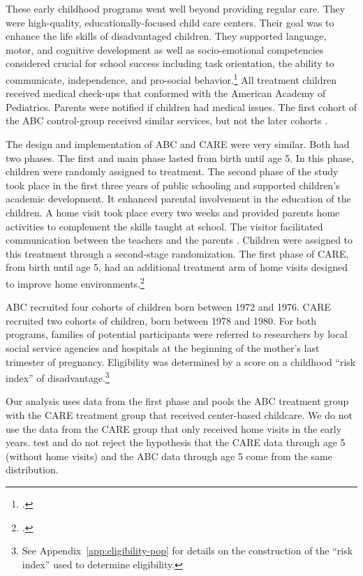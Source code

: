 These early childhood programs went well beyond providing regular care. They were high-quality, educationally-focused child care centers. Their goal was to enhance the life skills of disadvantaged children. They supported language, motor, and cognitive development as well as socio-emotional competencies considered crucial for school success including task orientation, the ability to communicate, independence, and pro-social behavior.\footnote{\citet{Sparling_1974_Synth_Edu_Infant_SPEECH, Ramey_Collier_etal_1976_CarolinaAbecedarianProject, Ramey_etal_1985_Project-CARE_TiECSE, Wasik_Ramey_etal_1990_CD, Ramey-etal_2012-ABC}.} All treatment children received medical check-ups that conformed with the American Academy of Pediatrics. Parents were notified if children had medical issues. The first cohort of the ABC control-group received similar services, but not the later cohorts \citep{Campbell_Conti_etal_2014_EarlyChildhoodInvestments,Henderson-et-al_1982_NEJoM}.

The design and implementation of ABC and CARE were very similar. Both had two phases. The first and main phase lasted from birth until age 5. In this phase, children were randomly assigned to treatment. The second phase of the study took place in the first three years of public schooling and supported children's academic development. It enhanced parental involvement in the education of the children. A home visit took place every two weeks and provided parents home activities to complement the skills taught at school. The visitor facilitated communication between the teachers and the parents \citep{Campbell_Ramey_1995_AERJ}. Children were assigned to this treatment through a second-stage randomization. The first phase of CARE, from birth until age 5, had an additional treatment arm of home visits designed to improve home environments.\footnote{\citet{Wasik_Ramey_etal_1990_CD}.}

ABC recruited four cohorts of children born between 1972 and 1976. CARE recruited two cohorts of children, born between 1978 and 1980. For both programs, families of potential participants were referred to researchers by local social service agencies and hospitals at the beginning of the mother's last trimester of pregnancy. Eligibility was determined by a score on a childhood ``risk index'' of disadvantage.\footnote{See  Appendix~\ref{app:eligibility-pop} for details on the construction of the ``risk index'' used to determine eligibility.}

Our analysis uses data from the first phase and pools the ABC treatment group with the CARE treatment group that received center-based childcare. We do not use the data from the CARE group that only received home visits in the early years. \cite{Campbell_Conti_etal_2014_EarlyChildhoodInvestments} test and do not reject the hypothesis that the CARE data through age 5 (without home visits) and the ABC data through age 5 come from the same distribution.

